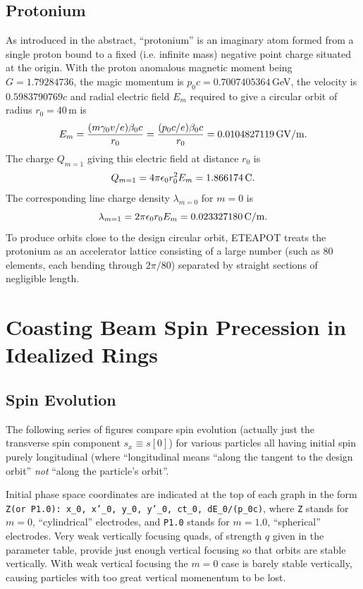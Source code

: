 \documentclass[]{article}
\begin{document}
\subsection{Protonium}
As introduced in the abstract, ``protonium'' is an imaginary atom
formed from a single proton bound to a fixed (i.e. infinite
mass) negative point charge situated at the origin. With the
proton anomalous magnetic moment being $G=1.79284736$, the magic
momentum is $p_0c=0.7007405364\,$GeV, the velocity is 
$0.5983790769 c$ and radial electric field
$E_m$ required to give a circular orbit of radius $r_0=40\,$m is
%
\begin{equation}
E_m 
 = 
\frac{(m\gamma_0v/e)\beta_0c}{r_0} 
 =
\frac{(p_0c/e)\beta_0c}{r_0}
 =
0.0104827119\,{\rm GV/m}.
\label{eq:Protonium.1}
\end{equation}
% 
The charge $Q_{m=1}$ giving this electric field at distance $r_0$ is 
%
\begin{equation}
Q_{m=1}
 =
4\pi\epsilon_0r_0^2E_m
 =
1.866174\,{\rm C}.
\label{eq:Protonium.2}
\end{equation}
% 
The corresponding line charge density $\lambda_{m=0}$ for $m=0$ is  
%
\begin{equation}
\lambda_{m=1}
 =
2\pi\epsilon_0r_0E_m
 =
0.023327180\,{\rm C/m}.
\label{eq:Protonium.3}
\end{equation}
%
To produce orbits close to the design circular orbit, ETEAPOT
treats the protonium as an accelerator lattice consisting of
a large number (such as 80 elements, each bending through
$2\pi/80$) separated by straight sections of negligible length.

\section{Coasting Beam Spin Precession in Idealized Rings}
\subsection{Spin Evolution}
The following series of figures compare spin evolution 
(actually just the transverse spin component $s_x\equiv s[0]$) for
various particles all having initial spin purely longitudinal
(where ``longitudinal means ``along the tangent to the design orbit''
\emph{not} ``along the particle's orbit''.

Initial phase space coordinates are indicated at the top
of each graph in the form 
{\tt Z(or P1.0): x\_0, x'\_0, y\_0, y'\_0, ct\_0, dE\_0/(p\_0c)},
where {\tt Z} stands for $m=0$, ``cylindrical'' electrodes,
and {\tt P1.0} stands for $m=1.0$, ``spherical''
electrodes. Very weak vertically focusing quads, of strength $q$ 
given in the parameter table, provide just enough vertical focusing 
so that orbits are stable vertically.
With weak vertical focusing the $m=0$ case is barely stable 
vertically, causing particles with too great vertical momenentum
to be lost.
\end{document}
